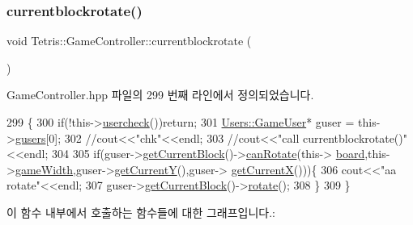 \subsubsection{\texorpdfstring{currentblockrotate()}{currentblockrotate()}\hspace{0.1cm}{\footnotesize\ttfamily [2/2]}}
{\footnotesize\ttfamily void Tetris\+::\+Game\+Controller\+::currentblockrotate (\begin{DoxyParamCaption}{ }\end{DoxyParamCaption})\hspace{0.3cm}{\ttfamily [inline]}}



Game\+Controller.\+hpp 파일의 299 번째 라인에서 정의되었습니다.


\begin{DoxyCode}
299                                      \{
300                 \textcolor{keywordflow}{if}(!this->\hyperlink{class_tetris_1_1_game_controller_ab96e22daad51119b35cbee8cfb7385ef}{usercheck}())\textcolor{keywordflow}{return};
301                 \hyperlink{class_tetris_1_1_users_1_1_game_user}{Users::GameUser}* guser = this->\hyperlink{class_tetris_1_1_game_controller_a1a31d3a933daad6d95e20458eea2900e}{gusers}[0];
302                 \textcolor{comment}{//cout<<"chk"<<endl;}
303                 \textcolor{comment}{//cout<<"call currentblockrotate()"<<endl;}
304                 
305                 \textcolor{keywordflow}{if}(guser->\hyperlink{class_tetris_1_1_users_1_1_game_user_a3d4bcc74d518c28356012f8a42b85896}{getCurrentBlock}()->\hyperlink{class_tetris_1_1_block_a56d194d0a5d56d2d1220ec32774cea38}{canRotate}(this->
      \hyperlink{class_tetris_1_1_game_controller_a7725b6cec9459a6bffaa3e29dd1c5196}{board},this->\hyperlink{class_tetris_1_1_game_controller_a439f215918db4127fcb44cf9d501ed63}{gameWidth},guser->\hyperlink{class_tetris_1_1_users_1_1_game_user_af5bd7ff0b575af1b42b093488cff97e2}{getCurrentY}(),guser->
      \hyperlink{class_tetris_1_1_users_1_1_game_user_ad25eace96bd27ae6df4a0c0d506be730}{getCurrentX}()))\{
306                     cout<<\textcolor{stringliteral}{"aa rotate"}<<endl;
307                 guser->\hyperlink{class_tetris_1_1_users_1_1_game_user_a3d4bcc74d518c28356012f8a42b85896}{getCurrentBlock}()->\hyperlink{class_tetris_1_1_block_a0d1eb57e6da91832ad983f7a4fa9ca04}{rotate}();
308                 \}
309             \}
\end{DoxyCode}
이 함수 내부에서 호출하는 함수들에 대한 그래프입니다.\+:
\nopagebreak

